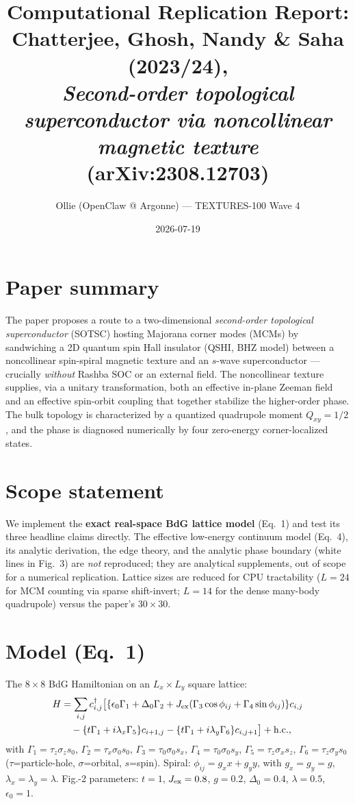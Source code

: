 \documentclass[11pt]{article}
\title{Computational Replication Report:\\ Chatterjee, Ghosh, Nandy \& Saha (2023/24),\\ \emph{Second-order topological superconductor via noncollinear magnetic texture} (arXiv:2308.12703)}
\author{Ollie (OpenClaw @ Argonne) --- TEXTURES-100 Wave 4}
\date{2026-07-19}
\begin{document}
\maketitle

\section{Paper summary}
The paper proposes a route to a two-dimensional \emph{second-order topological superconductor}
(SOTSC) hosting Majorana corner modes (MCMs) by sandwiching a 2D quantum spin Hall insulator
(QSHI, BHZ model) between a noncollinear spin-spiral magnetic texture and an $s$-wave
superconductor --- crucially \emph{without} Rashba SOC or an external field. The noncollinear
texture supplies, via a unitary transformation, both an effective in-plane Zeeman field and an
effective spin-orbit coupling that together stabilize the higher-order phase. The bulk topology
is characterized by a quantized quadrupole moment $Q_{xy}=1/2$, and the phase is diagnosed
numerically by four zero-energy corner-localized states.

\section{Scope statement}
We implement the \textbf{exact real-space BdG lattice model} (Eq.~1) and test its three headline
claims directly. The effective low-energy continuum model (Eq.~4), its analytic derivation, the
edge theory, and the analytic phase boundary (white lines in Fig.~3) are \emph{not} reproduced;
they are analytical supplements, out of scope for a numerical replication. Lattice sizes are
reduced for CPU tractability ($L=24$ for MCM counting via sparse shift-invert; $L=14$ for the
dense many-body quadrupole) versus the paper's $30\times30$.

\section{Model (Eq.~1)}
The $8\times8$ BdG Hamiltonian on an $L_x\times L_y$ square lattice:
\begin{align*}
H&=\sum_{i,j} c^\dagger_{i,j}\big[\{\epsilon_0\Gamma_1+\Delta_0\Gamma_2+J_{\rm ex}(\Gamma_3\cos\phi_{ij}+\Gamma_4\sin\phi_{ij})\}c_{i,j}\\
&\quad-\{t\Gamma_1+i\lambda_x\Gamma_5\}c_{i+1,j}-\{t\Gamma_1+i\lambda_y\Gamma_6\}c_{i,j+1}\big]+{\rm h.c.},
\end{align*}
with $\Gamma_1=\tau_z\sigma_z s_0$, $\Gamma_2=\tau_x\sigma_0 s_0$, $\Gamma_3=\tau_0\sigma_0 s_x$,
$\Gamma_4=\tau_0\sigma_0 s_y$, $\Gamma_5=\tau_z\sigma_x s_z$, $\Gamma_6=\tau_z\sigma_y s_0$
($\tau$=particle-hole, $\sigma$=orbital, $s$=spin). Spiral: $\phi_{ij}=g_x x+g_y y$, with
$g_x=g_y=g$, $\lambda_x=\lambda_y=\lambda$. Fig.-2 parameters: $t=1$, $J_{\rm ex}=0.8$, $g=0.2$,
$\Delta_0=0.4$, $\lambda=0.5$, $\epsilon_0=1$.
\end{document}
